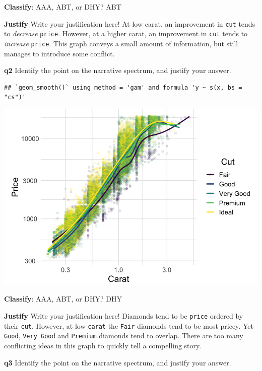 \documentclass[
]{article}
\begin{document}
\textbf{Classify}: AAA, ABT, or DHY? ABT

\textbf{Justify} Write your justification here! At low carat, an
improvement in \texttt{cut} tends to \emph{decrease} \texttt{price}.
However, at a higher carat, an improvement in \texttt{cut} tends to
\emph{increase} \texttt{price}. This graph conveys a small amount of
information, but still manages to introduce some conflict.

\newpage

\textbf{q2} Identify the point on the narrative spectrum, and justify
your answer.

\begin{verbatim}
## `geom_smooth()` using method = 'gam' and formula 'y ~ s(x, bs = "cs")'
\end{verbatim}

\includegraphics{e-comm01-story-basics_files/figure-latex/q2-vis-1.png}

\textbf{Classify}: AAA, ABT, or DHY? DHY

\textbf{Justify} Write your justification here! Diamonds tend to be
\texttt{price} ordered by their \texttt{cut}. However, at low
\texttt{carat} the \texttt{Fair} diamonds tend to be most pricey. Yet
\texttt{Good}, \texttt{Very\ Good} and \texttt{Premium} diamonds tend to
overlap. There are too many conflicting ideas in this graph to quickly
tell a compelling story.

\newpage

\textbf{q3} Identify the point on the narrative spectrum, and justify
your answer.
\end{document}
